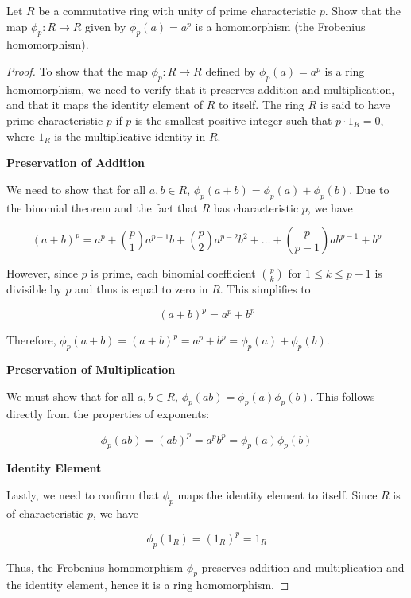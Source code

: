 \documentclass[12pt]{amsart}
\theoremstyle{definition}
\numberwithin{equation}{section}
\theoremstyle{plain}
\begin{document}
\begin{exercise}{20} Let $R$ be a commutative ring with unity of prime characteristic $p$. Show that the map $\phi_p : R \rightarrow R$ given by
    $\phi_p(a) = a^p$ is a homomorphism (the Frobenius homomorphism).
    \begin{proof}
        To show that the map \(\phi_p : R \rightarrow R\) defined by \(\phi_p(a) = a^p\) is a ring homomorphism, we need to verify that it preserves addition and multiplication, and that it maps the identity element of \( R \) to itself. The ring \( R \) is said to have prime characteristic \( p \) if \( p \) is the smallest positive integer such that \( p \cdot 1_R = 0 \), where \( 1_R \) is the multiplicative identity in \( R \).

\textbf{Preservation of Addition}

We need to show that for all \( a, b \in R \), \(\phi_p(a + b) = \phi_p(a) + \phi_p(b)\). Due to the binomial theorem and the fact that \( R \) has characteristic \( p \), we have

\[
(a + b)^p = a^p + \binom{p}{1} a^{p-1}b + \binom{p}{2} a^{p-2}b^2 + \ldots + \binom{p}{p-1} ab^{p-1} + b^p
\]

However, since \( p \) is prime, each binomial coefficient \( \binom{p}{k} \) for \( 1 \leq k \leq p-1 \) is divisible by \( p \) and thus is equal to zero in \( R \). This simplifies to

\[
(a + b)^p = a^p + b^p
\]

Therefore, \(\phi_p(a + b) = (a + b)^p = a^p + b^p = \phi_p(a) + \phi_p(b)\).

\textbf{Preservation of Multiplication}

We must show that for all \( a, b \in R \), \(\phi_p(ab) = \phi_p(a) \phi_p(b)\). This follows directly from the properties of exponents:

\[
\phi_p(ab) = (ab)^p = a^p b^p = \phi_p(a) \phi_p(b)
\]

\textbf{Identity Element}

Lastly, we need to confirm that \(\phi_p\) maps the identity element to itself. Since \( R \) is of characteristic \( p \), we have

\[
\phi_p(1_R) = (1_R)^p = 1_R
\]

Thus, the Frobenius homomorphism \( \phi_p \) preserves addition and multiplication and the identity element, hence it is a ring homomorphism.
    \end{proof}
\end{exercise}
\vspace*{20pt}
\end{document}
